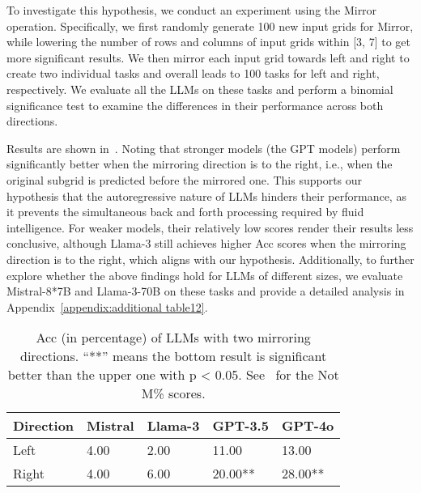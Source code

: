 To investigate this hypothesis, we conduct an experiment using the Mirror operation. Specifically, 
we first randomly generate 100 new input grids for Mirror, while lowering the number of rows and columns of input grids within [3, 7] to get more significant results. 
We then mirror each input grid towards left and right to create two individual tasks and overall leads to 100 tasks for left and right, respectively. We evaluate all the LLMs on these tasks and perform a binomial significance test to examine the differences in their performance across both directions. %

Results are shown in~. Noting that stronger models (the GPT models) perform significantly better when the mirroring direction is to the right, i.e., when the original subgrid is predicted before the mirrored one. This supports our hypothesis that the autoregressive nature of LLMs hinders their performance, as it prevents the simultaneous back and forth processing required by fluid intelligence. For weaker models, their relatively low scores render their results less conclusive, although Llama-3 still achieves higher Acc scores when the mirroring direction is to the right, which aligns with our hypothesis. Additionally, to further explore whether the above findings hold for LLMs of different sizes, we evaluate Mistral-8*7B and Llama-3-70B on these tasks and provide a detailed analysis in Appendix~\ref{appendix:additional table12}.



\begin{table}[tb]
\small
\centering
\setlength{\tabcolsep}{2mm}
\begin{tabular}{l|llll}
\toprule
\textbf{Direction}& \textbf{Mistral}& \textbf{Llama-3} & \textbf{GPT-3.5}& \textbf{GPT-4o} \\
\midrule[0.5pt]
Left &4.00 & 2.00 &11.00 & 13.00\\

Right &4.00 &6.00 &20.00** & 28.00**\\

\bottomrule
\end{tabular}

\caption{Acc (in percentage) of LLMs with two mirroring directions. ``**'' means 
 the bottom result is significant better than the upper one with p < 0.05. See~ for the Not M\% scores.}
\vspace{-0.2in}
\label{tab:autoregressive}
\end{table}


